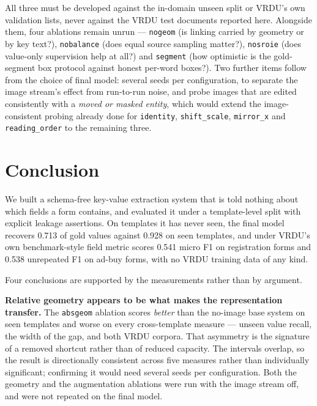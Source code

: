 \documentclass[11pt,a4paper]{article}
\newcommand{\code}[1]{\texttt{\small #1}}
\begin{document}
All three must be developed against the in-domain unseen split or VRDU's own validation lists,
never against the VRDU test documents reported here. Alongside them, four ablations remain
unrun --- \code{nogeom} (is linking carried by geometry or by key text?), \code{nobalance} (does
equal source sampling matter?), \code{nosroie} (does value-only supervision help at all?) and
\code{segment} (how optimistic is the gold-segment box protocol against honest per-word boxes?).
Two further items follow from the choice of final model: several seeds per configuration, to
separate the image stream's effect from run-to-run noise, and probe images that are edited
consistently with a \emph{moved or masked entity}, which would extend the image-consistent probing
already done for \code{identity}, \code{shift\_scale}, \code{mirror\_x} and \code{reading\_order}
to the remaining three.

\section{Conclusion}
\label{sec:conclusion}

We built a schema-free key-value extraction system that is told nothing about which fields a form
contains, and evaluated it under a template-level split with explicit leakage assertions. On
templates it has never seen, the final model recovers 0.713 of gold values against 0.928 on seen
templates, and under VRDU's own benchmark-style field metric scores 0.541 micro F1 on
registration forms and 0.538 unrepeated F1 on ad-buy forms, with no VRDU training data of any
kind.

Four conclusions are supported by the measurements rather than by argument.

\textbf{Relative geometry appears to be what makes the representation transfer.} The
\code{absgeom} ablation scores \emph{better} than the no-image base system on seen templates and worse on
every cross-template measure --- unseen value recall, the width of the gap, and both VRDU corpora.
That asymmetry is the signature of a removed shortcut rather than of reduced capacity. The
intervals overlap, so the result is directionally consistent across five measures rather than
individually significant; confirming it would need several seeds per configuration. Both the
geometry and the augmentation ablations were run with the image stream off, and were not
repeated on the final model.
\end{document}
